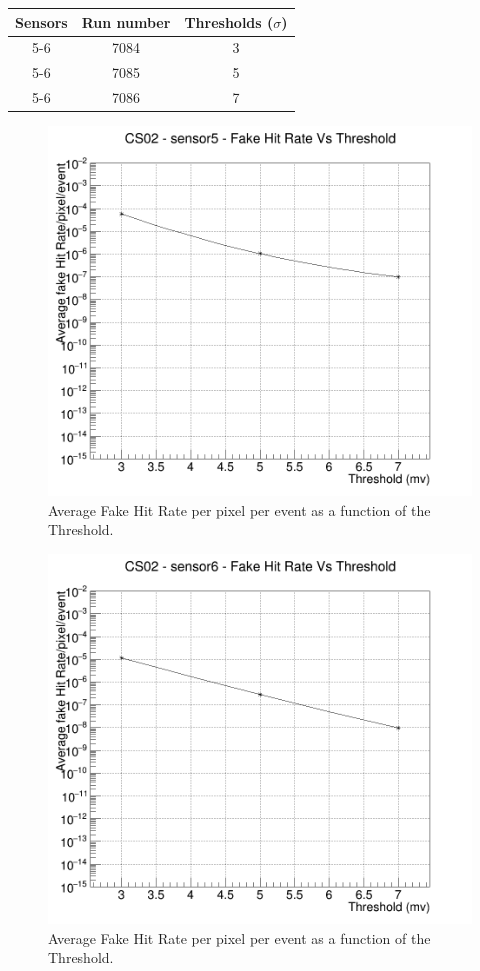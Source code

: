 \documentclass[a4papper, 10pt]{article}
\begin{document}
  \begin{center}
    \begin{tabular}{|c|c|c|}
      \hline %
   \rowcolor{light-gray}  Sensors  &  Run number  &  Thresholds  ($\sigma$) \tabularnewline
      \hline %
      5-6   &   7084   &    3 \tabularnewline
      \hline %
      5-6   &   7085   &    5 \tabularnewline
      \hline %
      5-6   &   7086   &    7 \tabularnewline
      \hline %
    \end{tabular}
  \end{center}

          \begin{figure}[!h]
            \centering
            \includegraphics[width = 12cm]{Output_CS02_FHR/Fake_results_CS02_sensor5.png}
            \caption{Average Fake Hit Rate per pixel per event as a function of the Threshold.}
          \end{figure}
    \FloatBarrier 
        \begin{figure}[!h]
            \centering
            \includegraphics[width = 12cm]{Output_CS02_FHR/Fake_results_CS02_sensor6.png}
            \caption{Average Fake Hit Rate per pixel per event as a function of the Threshold.}
        \end{figure}
    \FloatBarrier 

 
\end{document}
